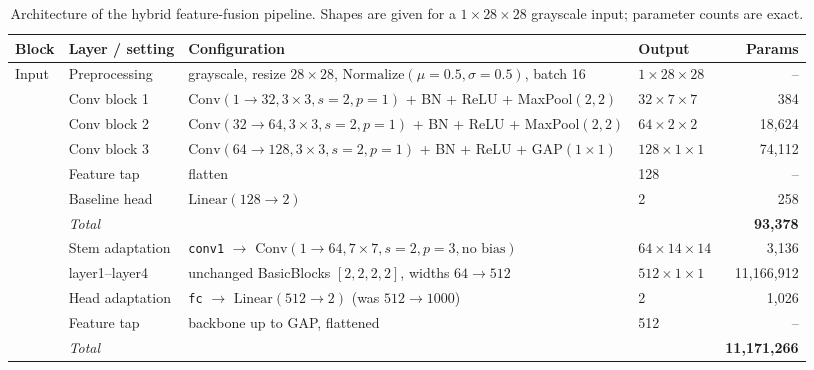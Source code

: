 
\begin{table}[t]
\centering
\caption{Architecture of the hybrid feature-fusion pipeline. Shapes are given for a
$1\times28\times28$ grayscale input; parameter counts are exact.}
\label{tab:architecture}
\footnotesize
\setlength{\tabcolsep}{4pt}
\begin{tabular}{@{}llllr@{}}
\toprule
\textbf{Block} & \textbf{Layer / setting} & \textbf{Configuration} & \textbf{Output} & \textbf{Params} \\
\midrule

Input & Preprocessing & grayscale, resize $28\times28$, $\mathrm{Normalize}(\mu{=}0.5,\sigma{=}0.5)$, batch 16 & $1\times28\times28$ & -- \\
\midrule

 & Conv block 1 & $\mathrm{Conv}(1{\to}32,3{\times}3,s{=}2,p{=}1)$ + BN + ReLU + MaxPool$(2,2)$ & $32\times7\times7$ & 384 \\
 & Conv block 2 & $\mathrm{Conv}(32{\to}64,3{\times}3,s{=}2,p{=}1)$ + BN + ReLU + MaxPool$(2,2)$ & $64\times2\times2$ & 18{,}624 \\
 & Conv block 3 & $\mathrm{Conv}(64{\to}128,3{\times}3,s{=}2,p{=}1)$ + BN + ReLU + GAP$(1{\times}1)$ & $128\times1\times1$ & 74{,}112 \\
 & Feature tap & flatten & 128 & -- \\
 & Baseline head & $\mathrm{Linear}(128{\to}2)$ & 2 & 258 \\
 & \textit{Total} & & & \textbf{93{,}378} \\
\midrule

 & Stem adaptation & \texttt{conv1} $\to$ $\mathrm{Conv}(1{\to}64,7{\times}7,s{=}2,p{=}3,\text{no bias})$ & $64\times14\times14$ & 3{,}136 \\
 & layer1--layer4 & unchanged BasicBlocks $[2,2,2,2]$, widths $64{\to}512$ & $512\times1\times1$ & 11{,}166{,}912 \\
 & Head adaptation & \texttt{fc} $\to$ $\mathrm{Linear}(512{\to}2)$ (was $512{\to}1000$) & 2 & 1{,}026 \\
 & Feature tap & backbone up to GAP, flattened & 512 & -- \\
 & \textit{Total} & & & \textbf{11{,}171{,}266} \\
\midrule


\end{tabular}
\end{table}
